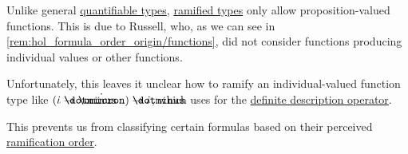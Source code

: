 \begin{remark}\label{rem:unpropositional_functions_in_ramified_theory_of_types}
  Unlike general \hyperref[def:hol_signature/universes/quant]{quantifiable types}, \hyperref[def:ramified_theory_of_types/ramified_type]{ramified types} only allow proposition-valued functions. This is due to Russell, who, as we can see in \cref{rem:hol_formula_order_origin/functions}, did not consider functions producing individual values or other functions.

  Unfortunately, this leaves it unclear how to ramify an individual-valued function type like \( (\syn\iota \synimplies \syn\omicron) \synimplies \syn\iota \), which  uses for the \hyperref[con:description_operator]{definite description operator}.

  This prevents us from classifying certain formulas based on their perceived \hyperref[def:hol_formula_ramification_order]{ramification order}.
\end{remark}

